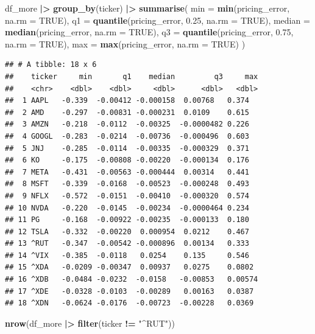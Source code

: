 \documentclass[
]{article}
\newenvironment{Shaded}{\begin{snugshade}}{\end{snugshade}}
\newcommand{\AttributeTok}[1]{\textcolor[rgb]{0.13,0.29,0.53}{#1}}
\newcommand{\ConstantTok}[1]{\textcolor[rgb]{0.56,0.35,0.01}{#1}}
\newcommand{\FloatTok}[1]{\textcolor[rgb]{0.00,0.00,0.81}{#1}}
\newcommand{\FunctionTok}[1]{\textcolor[rgb]{0.13,0.29,0.53}{\textbf{#1}}}
\newcommand{\NormalTok}[1]{#1}
\newcommand{\SpecialCharTok}[1]{\textcolor[rgb]{0.81,0.36,0.00}{\textbf{#1}}}
\newcommand{\StringTok}[1]{\textcolor[rgb]{0.31,0.60,0.02}{#1}}
\begin{document}
\begin{Shaded}
\begin{Highlighting}[]
\NormalTok{df\_more }\SpecialCharTok{|\textgreater{}}
  \FunctionTok{group\_by}\NormalTok{(ticker) }\SpecialCharTok{|\textgreater{}}
  \FunctionTok{summarise}\NormalTok{(}
    \AttributeTok{min    =} \FunctionTok{min}\NormalTok{(pricing\_error, }\AttributeTok{na.rm =} \ConstantTok{TRUE}\NormalTok{),}
    \AttributeTok{q1     =} \FunctionTok{quantile}\NormalTok{(pricing\_error, }\FloatTok{0.25}\NormalTok{, }\AttributeTok{na.rm =} \ConstantTok{TRUE}\NormalTok{),}
    \AttributeTok{median =} \FunctionTok{median}\NormalTok{(pricing\_error, }\AttributeTok{na.rm =} \ConstantTok{TRUE}\NormalTok{),}
    \AttributeTok{q3     =} \FunctionTok{quantile}\NormalTok{(pricing\_error, }\FloatTok{0.75}\NormalTok{, }\AttributeTok{na.rm =} \ConstantTok{TRUE}\NormalTok{),}
    \AttributeTok{max    =} \FunctionTok{max}\NormalTok{(pricing\_error, }\AttributeTok{na.rm =} \ConstantTok{TRUE}\NormalTok{)}
\NormalTok{  )}
\end{Highlighting}
\end{Shaded}

\begin{verbatim}
## # A tibble: 18 x 6
##    ticker     min       q1    median         q3     max
##    <chr>    <dbl>    <dbl>     <dbl>      <dbl>   <dbl>
##  1 AAPL   -0.339  -0.00412 -0.000158  0.00768   0.374  
##  2 AMD    -0.297  -0.00831 -0.000231  0.0109    0.615  
##  3 AMZN   -0.218  -0.0112  -0.00325  -0.0000482 0.226  
##  4 GOOGL  -0.283  -0.0214  -0.00736  -0.000496  0.603  
##  5 JNJ    -0.285  -0.0114  -0.00335  -0.000329  0.371  
##  6 KO     -0.175  -0.00808 -0.00220  -0.000134  0.176  
##  7 META   -0.431  -0.00563 -0.000444  0.00314   0.441  
##  8 MSFT   -0.339  -0.0168  -0.00523  -0.000248  0.493  
##  9 NFLX   -0.572  -0.0151  -0.00410  -0.000320  0.574  
## 10 NVDA   -0.220  -0.0145  -0.00234  -0.0000464 0.234  
## 11 PG     -0.168  -0.00922 -0.00235  -0.000133  0.180  
## 12 TSLA   -0.332  -0.00220  0.000954  0.0212    0.467  
## 13 ^RUT   -0.347  -0.00542 -0.000896  0.00134   0.333  
## 14 ^VIX   -0.385  -0.0118   0.0254    0.135     0.546  
## 15 ^XDA   -0.0209 -0.00347  0.00937   0.0275    0.0802 
## 16 ^XDB   -0.0484 -0.0232  -0.0158   -0.00853   0.00574
## 17 ^XDE   -0.0328 -0.0103  -0.00289   0.00163   0.0387 
## 18 ^XDN   -0.0624 -0.0176  -0.00723  -0.00228   0.0369
\end{verbatim}

\begin{Shaded}
\begin{Highlighting}[]
\FunctionTok{nrow}\NormalTok{(df\_more }\SpecialCharTok{|\textgreater{}} \FunctionTok{filter}\NormalTok{(ticker }\SpecialCharTok{!=} \StringTok{"\^{}RUT"}\NormalTok{))}
\end{Highlighting}
\end{Shaded}
\end{document}
